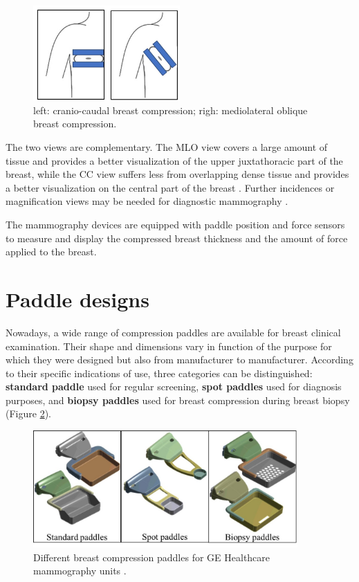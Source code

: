 \begin{figure}[!h]
\centering
\includegraphics[width=0.5\textwidth,keepaspectratio]{figures/cc_mlo_view.jpg} 
\caption{left: cranio-caudal breast compression; righ: mediolateral oblique breast compression. }
\label{fig:cc_mlo_view}
\end{figure}

 The two views are complementary. The MLO view covers a large amount of tissue and provides a better visualization of the upper juxtathoracic part of the breast, while the CC view suffers less from overlapping dense tissue and provides a better visualization on the central part of the breast \citep{chan_image_1987,kim_computer_2006}.  Further incidences or magnification views may be needed for diagnostic mammography \citep{groot_towards_2015}.
 

The mammography devices are equipped with paddle position and force sensors to measure and display the compressed breast thickness and the amount of force applied to the breast.

\section{Paddle designs} \label{section:compressionpaddlesdesign}

Nowadays, a wide range of compression paddles are available for breast clinical examination. Their shape and dimensions vary in function of the purpose for which they were designed but also from manufacturer to manufacturer. According to their specific
indications of use, three categories can be distinguished: \textbf{standard paddle} used for regular screening, \textbf{spot paddles} used for diagnosis purposes, and \textbf{biopsy paddles} used for breast compression during breast biopsy (Figure \ref{fig:compressionpaddlestypes}). 


\begin{figure}[!h]
\centering
\includegraphics[width=0.9\textwidth,keepaspectratio]{figures/compressionpaddlestypes.jpg} 
\caption{Different breast compression paddles for GE Healthcare mammography units .}\label{fig:compressionpaddlestypes}
\end{figure}
    

